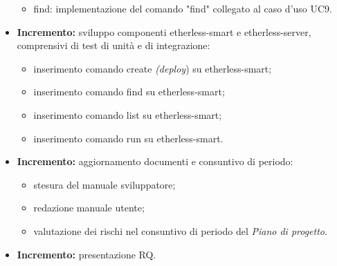 \begin{itemize}
\begin{itemize}
    \item find: implementazione del comando "find" collegato al caso d'uso UC9.
  \end{itemize}
	\item \textbf{ Incremento:} sviluppo componenti etherless-smart e etherless-server, comprensivi di test di unità e di integrazione:
	\begin{itemize}
		\item inserimento comando create \textit{(deploy}\glo) su etherless-smart;
		\item inserimento comando find su etherless-smart;
		\item inserimento comando list su etherless-smart;
		\item inserimento comando run su etherless-smart.
	\end{itemize}
	\item \textbf{ Incremento:} aggiornamento documenti e consuntivo di periodo:
  \begin{itemize}
  	\item stesura del manuale sviluppatore;
    \item redazione manuale utente;
    \item valutazione dei rischi nel consuntivo di periodo del \textit{Piano di progetto}\docs.
  \end{itemize}
	\item \textbf{ Incremento:} presentazione RQ.
\end{itemize}
